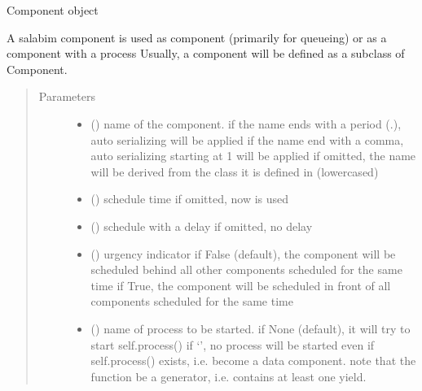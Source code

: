 \documentclass[letterpaper,10pt,english]{sphinxmanual}
\begin{document}
\begin{fulllineitems}
\label{\detokenize{Reference:salabim.Component}}
Component object

A salabim component is used as component (primarily for queueing)
or as a component with a process 
Usually, a component will be defined as a subclass of Component.
\begin{quote}\begin{description}
\item[{Parameters}] \leavevmode\begin{itemize}
\item {} 
 () \textendash{} name of the component. 
if the name ends with a period (.),
auto serializing will be applied 
if the name end with a comma,
auto serializing starting at 1 will be applied 
if omitted, the name will be derived from the class
it is defined in (lowercased)

\item {} 
 () \textendash{} schedule time 
if omitted, now is used

\item {} 
 () \textendash{} schedule with a delay 
if omitted, no delay

\item {} 
 () \textendash{} urgency indicator 
if False (default), the component will be scheduled
behind all other components scheduled
for the same time 
if True, the component will be scheduled
in front of all components scheduled
for the same time

\item {} 
 () \textendash{} name of process to be started. 
if None (default), it will try to start self.process() 
if ‘’, no process will be started even if self.process() exists,
i.e. become a data component. 
note that the function  be a generator,
i.e. contains at least one yield.


\end{itemize}
\end{description}
\end{quote}
\end{fulllineitems}
\end{document}
